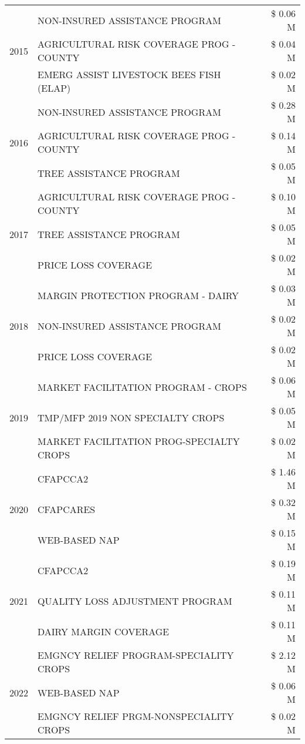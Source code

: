 \begin{tabular}{llr}
\cline{1-3}
\multirow[t]{3}{*}{2015} & NON-INSURED ASSISTANCE PROGRAM & \$ 0.06 M \\
 & AGRICULTURAL RISK COVERAGE PROG - COUNTY & \$ 0.04 M \\
 & EMERG ASSIST LIVESTOCK BEES FISH (ELAP) & \$ 0.02 M \\
\cline{1-3}
\multirow[t]{3}{*}{2016} & NON-INSURED ASSISTANCE PROGRAM & \$ 0.28 M \\
 & AGRICULTURAL RISK COVERAGE PROG - COUNTY & \$ 0.14 M \\
 & TREE ASSISTANCE PROGRAM & \$ 0.05 M \\
\cline{1-3}
\multirow[t]{3}{*}{2017} & AGRICULTURAL RISK COVERAGE PROG - COUNTY & \$ 0.10 M \\
 & TREE ASSISTANCE PROGRAM & \$ 0.05 M \\
 & PRICE LOSS COVERAGE & \$ 0.02 M \\
\cline{1-3}
\multirow[t]{3}{*}{2018} & MARGIN PROTECTION PROGRAM - DAIRY & \$ 0.03 M \\
 & NON-INSURED ASSISTANCE PROGRAM & \$ 0.02 M \\
 & PRICE LOSS COVERAGE & \$ 0.02 M \\
\cline{1-3}
\multirow[t]{3}{*}{2019} & MARKET FACILITATION PROGRAM - CROPS & \$ 0.06 M \\
 & TMP/MFP 2019 NON SPECIALTY CROPS & \$ 0.05 M \\
 & MARKET FACILITATION PROG-SPECIALTY CROPS & \$ 0.02 M \\
\cline{1-3}
\multirow[t]{3}{*}{2020} & CFAPCCA2 & \$ 1.46 M \\
 & CFAPCARES & \$ 0.32 M \\
 & WEB-BASED NAP & \$ 0.15 M \\
\cline{1-3}
\multirow[t]{3}{*}{2021} & CFAPCCA2 & \$ 0.19 M \\
 & QUALITY LOSS ADJUSTMENT PROGRAM & \$ 0.11 M \\
 & DAIRY MARGIN COVERAGE & \$ 0.11 M \\
\cline{1-3}
\multirow[t]{3}{*}{2022} & EMGNCY RELIEF PROGRAM-SPECIALITY CROPS & \$ 2.12 M \\
 & WEB-BASED NAP & \$ 0.06 M \\
 & EMGNCY RELIEF PRGM-NONSPECIALITY CROPS & \$ 0.02 M \\
\cline{1-3}
\bottomrule
\end{tabular}
